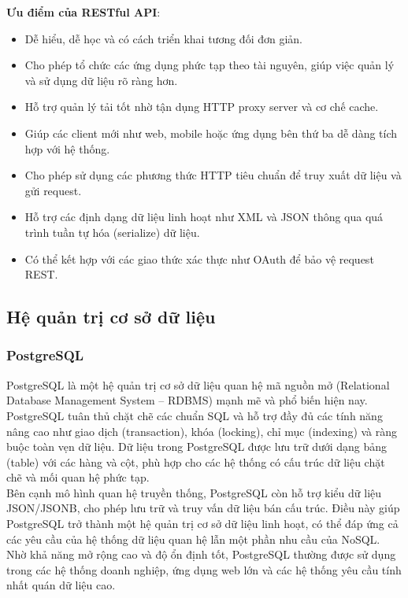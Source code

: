 \textbf{Ưu điểm của RESTful API}:
\begin{itemize}
    \item Dễ hiểu, dễ học và có cách triển khai tương đối đơn giản.
    \item Cho phép tổ chức các ứng dụng phức tạp theo tài nguyên, giúp việc quản lý và sử dụng dữ liệu rõ ràng hơn.
    \item Hỗ trợ quản lý tải tốt nhờ tận dụng HTTP proxy server và cơ chế cache.
    \item Giúp các client mới như web, mobile hoặc ứng dụng bên thứ ba dễ dàng tích hợp với hệ thống.
    \item Cho phép sử dụng các phương thức HTTP tiêu chuẩn để truy xuất dữ liệu và gửi request.
    \item Hỗ trợ các định dạng dữ liệu linh hoạt như XML và JSON thông qua quá trình tuần tự hóa (serialize) dữ liệu.
    \item Có thể kết hợp với các giao thức xác thực như OAuth để bảo vệ request REST.
\end{itemize}

\subsection{Hệ quản trị cơ sở dữ liệu}
\subsubsection{PostgreSQL}
PostgreSQL là một hệ quản trị cơ sở dữ liệu quan hệ mã nguồn mở (Relational Database Management System – RDBMS) mạnh mẽ và phổ biến hiện nay. PostgreSQL tuân thủ chặt chẽ các chuẩn SQL và hỗ trợ đầy đủ các tính năng nâng cao như giao dịch (transaction), khóa (locking), chỉ mục (indexing) và ràng buộc toàn vẹn dữ liệu. Dữ liệu trong PostgreSQL được lưu trữ dưới dạng bảng (table) với các hàng và cột, phù hợp cho các hệ thống có cấu trúc dữ liệu chặt chẽ và mối quan hệ phức tạp.\\

Bên cạnh mô hình quan hệ truyền thống, PostgreSQL còn hỗ trợ kiểu dữ liệu JSON/JSONB, cho phép lưu trữ và truy vấn dữ liệu bán cấu trúc. Điều này giúp PostgreSQL trở thành một hệ quản trị cơ sở dữ liệu linh hoạt, có thể đáp ứng cả các yêu cầu của hệ thống dữ liệu quan hệ lẫn một phần nhu cầu của NoSQL. Nhờ khả năng mở rộng cao và độ ổn định tốt, PostgreSQL thường được sử dụng trong các hệ thống doanh nghiệp, ứng dụng web lớn và các hệ thống yêu cầu tính nhất quán dữ liệu cao.

